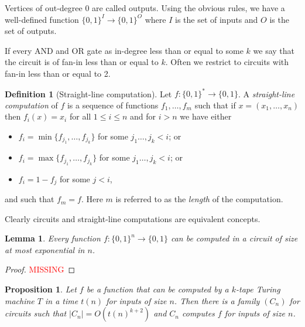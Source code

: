 \documentclass{report}
\theoremstyle{definition}
\theoremstyle{plain}
\newtheorem{prop}[thm]{Proposition}
\newtheorem{lem}[thm]{Lemma}
\theoremstyle{definition}
\newtheorem{defn}[thm]{Definition}
\begin{document}
	Vertices of out-degree 0 are called outputs. Using the obvious rules, we have a well-defined function $\{0,1\}^I \to \{0,1\}^O$ where $I$ is the set of inputs and $O$ is the set of outputs. 
	
	If every AND and OR gate as in-degree less than or equal to some $k$ we say that the circuit is of fan-in less than or equal to $k$. Often we restrict to circuits with fan-in less than or equal to 2.
	
	\begin{defn}[Straight-line computation]
		Let $f\colon \{0,1\}^* \to \{0,1\}$. A \emph{straight-line computation} of $f$ is a sequence of functions $f_1,\ldots,f_m$ such that if $x = (x_1,\ldots,x_n)$ then $f_i(x) = x_i$ for all $1\leq i \leq n$ and for $i>n$ we have either
		\begin{itemize}
			\item $f_i = \min\{f_{j_1}, \ldots, f_{j_k}\}$ for some $j_1\ldots,j_k <i$; or
			\item $f_i = \max\{f_{j_1}, \ldots, f_{j_k}\}$ for some $j_1\ldots,j_k <i$; or
			\item $f_i = 1-f_j$ for some $j<i$,
		\end{itemize}
		and such that $f_m = f$. Here $m$ is referred to as the \emph{length} of the computation.
	\end{defn}
	Clearly circuits and straight-line computations are equivalent concepts.
	\begin{lem}\label{lem:circuit_comp_bool}
		Every function $f\colon \{0,1\}^n \to \{0,1\}$ can be computed in a circuit of size at most exponential in $n$.
	\end{lem}
	\begin{proof}
		\textcolor{red}{MISSING}
	\end{proof}
	\begin{prop}\label{prop:circuit_comp_poly}
		Let $f$ be a function that can be computed by a $k$-tape Turing machine $T$ in a time $t(n)$ for inputs of size $n$. Then there is a family $(C_n)$ for circuits such that $|C_n| = O(t(n)^{k+2})$ and $C_n$ computes $f$ for inputs of size $n$.
	\end{prop}
\end{document}
